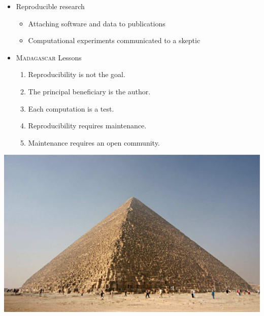 
%




\begin{frame}
\MadLogo
\bfseries
\centering
  \begin{itemize}
  \item Reproducible research
    \begin{itemize}
    \item Attaching software and data to publications
    \item Computational experiments communicated to a skeptic
    \end{itemize}
  \item \textsc{Madagascar} Lessons
    \begin{enumerate}
      \item Reproducibility is not the goal.
      \item The principal beneficiary is the author.
      \item Each computation is a test.
      \item Reproducibility requires maintenance.
      \item Maintenance requires an open community.
    \end{enumerate}
\end{itemize}
    \begin{center}
      \includegraphics[height=0.4\textheight]{Fig/Kheops-Pyramid}
    \end{center}
  \end{frame}
